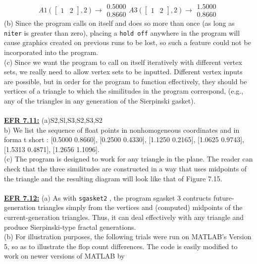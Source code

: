 \documentclass[../main.tex]{subfiles}
\begin{document}
$$
A 1\left(\left[\begin{array}{ll}
1 & 2
\end{array}\right], 2\right) \rightarrow \begin{array}{r}
0.5000 \\
0.8660
\end{array}
A 3\left(\left[\begin{array}{ll}
1 & 2
\end{array}\right], 2\right) \rightarrow \begin{array}{r}
1.5000 \\
0.8660
\end{array}
$$
(b) Since the program calls on itself and does so more than once (as long as \texttt{niter} is greater than 
zero), placing a \texttt{hold off} anywhere in the program will cause graphics created on previous runs to 
be lost, so such a feature could not be incorporated into the program. \\
(c) Since we want the program to call on itself iteratively with different vertex sets, we really need to 
allow vertex sets to be inputted. Different vertex inputs are possible, but in order for the program to 
function effectively, they should be vertices of a triangle to which the similitudes in the program 
correspond, (e.g., any of the triangles in any generation of the Sierpinski gasket). 
\\
\\
\textbf{\underline{EFR 7.11:}} (a)S2,Sl,S3,S2,S3,S2 \\
b) We list the sequence of float points in nonhomogeneous coordinates and in forma t short : 
[0.5000 0.8660], [0.2500 0.4330], [1.1250 0.2165], [1.0625 0.9743], [1.5313 0.4871], 
[1.2656 1.1096]. \\
(c) The program is designed to work for any triangle in the plane. The reader can check that the three 
similitudes are constructed in a way that uses midpoints of the triangle and the resulting diagram will 
look like that of Figure 7.15. 
\\
\\
\textbf{\underline{EFR 7.12:}} (a) As with \texttt{sgasket2} , the program sgasket 3 contructs future-generation triangles 
simply from the vertices and (computed) midpoints of the current-generation triangles. Thus, it can 
deal effectively with any triangle and produce Sierpinski-type fractal generations. \\
(b) For illustration purposes, the following trials were run on MATLAB's Version 5, so as to illustrate 
the flop count differences. The code is easily modified to work on newer versions of MATLAB by 
\end{document}
